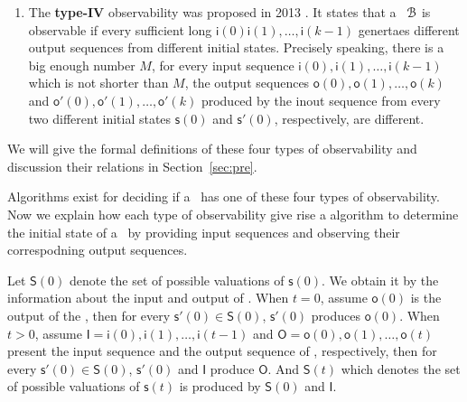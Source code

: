 \begin{enumerate}
\item  The  {\bf type-IV}  observability was  proposed in 2013 \cite{Fornasini2013Observability}. It states that a \BCN\ ${\mathcal{B}}$ is observable if every sufficient long $\mathsf{i}(0)\mathsf{i}(1),\ldots,\mathsf{i}(k-1)$ genertaes different output sequences  from different initial states. Precisely speaking, there is a big enough number $M$, for every  input sequence $\mathsf{i}(0),\mathsf{i}(1),\ldots, \mathsf{i}(k-1)$ which is not shorter than $M$, the output sequences $\mathsf{o}(0), \mathsf{o}(1), \ldots, \mathsf{o}(k)$ and  $\mathsf{o}'(0), \mathsf{o}'(1), \ldots, \mathsf{o}'(k)$ produced by the inout sequence from every two different initial states $\mathsf{s}(0)$ and $\mathsf{s}'(0)$, respectively, are different.
\end{enumerate}
 We will give the formal definitions of these four types of observability and discussion their relations in Section~\ref{sec:pre}.

Algorithms exist for deciding if a \BCN\ has one of these four types of observability. Now we explain how each type of observability give rise a algorithm to determine the initial state of a \BCN\ by providing input sequences and observing their correspodning output sequences.

Let $\mathsf{S}(0)$ denote the set of possible valuations of $\mathsf{s}(0)$. We obtain it by the information about the input and output of \BCN. When $t=0$, assume $\mathsf{o}(0)$ is the output of the \BCN, then for every $\mathsf{s}'(0)\in\mathsf{S}(0)$, $\mathsf{s}'(0)$ produces $\mathsf{o}(0)$. When $t>0$, assume $\mathsf{I}=\mathsf{i}(0),\mathsf{i}(1),\ldots,\mathsf{i}(t-1)$ and $\mathsf{O}=\mathsf{o}(0),\mathsf{o}(1),\ldots,\mathsf{o}(t)$ present the input sequence and the output sequence of \BCN, respectively, then for every $\mathsf{s}'(0)\in\mathsf{S}(0)$, $\mathsf{s}'(0)$ and $\mathsf{I}$  produce  $\mathsf{O}$. And $\mathsf{S}(t)$ which denotes the set of possible valuations of $\mathsf{s}(t)$ is produced by $\mathsf{S}(0)$ and $\mathsf{I}$.


